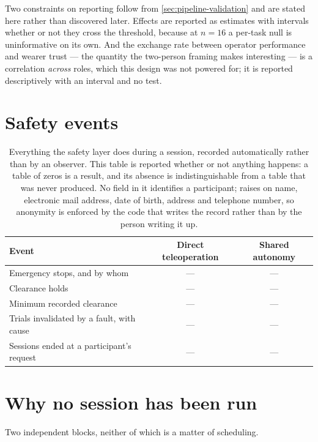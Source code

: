 Two constraints on reporting follow from \cref{sec:pipeline-validation} and
are stated here rather than discovered later. Effects are reported as
estimates with intervals whether or not they cross the threshold, because at
$n = 16$ a per-task null is uninformative on its own. And the exchange rate
between operator performance and wearer trust --- the quantity the two-person
framing makes interesting --- is a correlation \emph{across} roles, which this
design was not powered for; it is reported descriptively with an interval and
no test.

\section{Safety events}

\begin{table}[htbp]
  \centering
  \small
  \caption[Safety events during sessions]{Everything the safety layer does
  during a session, recorded automatically rather than by an observer. This
  table is reported whether or not anything happens: a table of zeros is a
  result, and its absence is indistinguishable from a table that was never
  produced. No field in it identifies a participant;
   raises on name, electronic mail address, date of
  birth, address and telephone number, so anonymity is enforced by the code
  that writes the record rather than by the person writing it up.}
  \label{tab:safety-events}
  \begin{tabular}{@{}lcc@{}}
    \toprule
    Event & Direct teleoperation & Shared autonomy \\
    \midrule
    Emergency stops, and by whom & --- & --- \\
    Clearance holds & --- & --- \\
    Minimum recorded clearance & --- & --- \\
    Trials invalidated by a fault, with cause & --- & --- \\
    Sessions ended at a participant's request & --- & --- \\
    \bottomrule
  \end{tabular}
\end{table}

\section{Why no session has been run}
\label{sec:blocked}

Two independent blocks, neither of which is a matter of scheduling.

